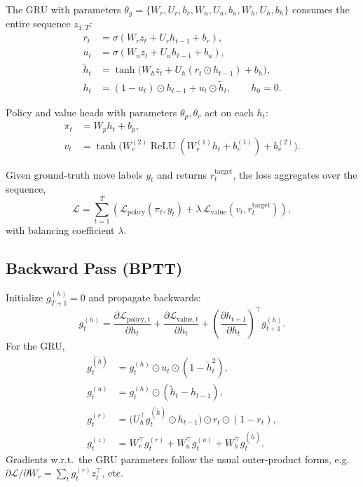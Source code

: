 \documentclass[tikz,12pt,a4paper]{article}
\theoremstyle{definition}
\begin{document}
  The GRU with parameters $\theta_g = \{W_r,U_r,b_r,W_u,U_u,b_u,W_h,U_h,b_h\}$ consumes the entire sequence $z_{1:T}$:
  \begin{align}
      r_t &= \sigma(W_r z_t + U_r h_{t-1} + b_r),\\
      u_t &= \sigma(W_u z_t + U_u h_{t-1} + b_u),\\
      \tilde{h}_t &= \tanh\!\big(W_h z_t + U_h (r_t \odot h_{t-1}) + b_h\big),\\
      h_t &= (1-u_t) \odot h_{t-1} + u_t \odot \tilde{h}_t, \qquad h_0 = 0.
  \end{align}

  Policy and value heads with parameters $\theta_p,\theta_v$ act on each $h_t$:
  \begin{align}
      \pi_t &= W_p h_t + b_p, \\
      v_t &= \tanh\!\big(W_v^{(2)} \operatorname{ReLU}(W_v^{(1)} h_t + b_v^{(1)}) + b_v^{(2)}\big).
  \end{align}

  Given ground-truth move labels $y_t$ and returns $r_t^{\text{target}}$, the loss aggregates over the sequence,
  \begin{equation}
      \mathcal{L} = \sum_{t=1}^{T} \left(
          \mathcal{L}_{\text{policy}}(\pi_t, y_t) +
          \lambda \,\mathcal{L}_{\text{value}}(v_t, r_t^{\text{target}})
      \right),
  \end{equation}
  with balancing coefficient $\lambda$.

  \subsection*{Backward Pass (BPTT)}

  Initialize $g_{T+1}^{(h)} = 0$ and propagate backwards:
  \begin{equation}
      g_t^{(h)} = \frac{\partial \mathcal{L}_{\text{policy},t}}{\partial h_t}
                + \frac{\partial \mathcal{L}_{\text{value},t}}{\partial h_t}
                + \left(\frac{\partial h_{t+1}}{\partial h_t}\right)^{\!\top} g_{t+1}^{(h)}.
  \end{equation}
  For the GRU,
  \begin{align}
      g_t^{(\tilde{h})} &= g_t^{(h)} \odot u_t \odot (1 - \tilde{h}_t^2),\\
      g_t^{(u)} &= g_t^{(h)} \odot (\tilde{h}_t - h_{t-1}),\\
      g_t^{(r)} &= \big(U_h^\top g_t^{(\tilde{h})} \odot h_{t-1}\big) \odot r_t \odot (1 - r_t),\\
      g_t^{(z)} &= W_r^\top g_t^{(r)} + W_u^\top g_t^{(u)} + W_h^\top g_t^{(\tilde{h})}.
  \end{align}
  Gradients w.r.t.\ the GRU parameters follow the usual outer-product forms, e.g.\ $\partial \mathcal{L}/\partial W_r = \sum_t g_t^{(r)} z_t^\top$, etc.
\end{document}
